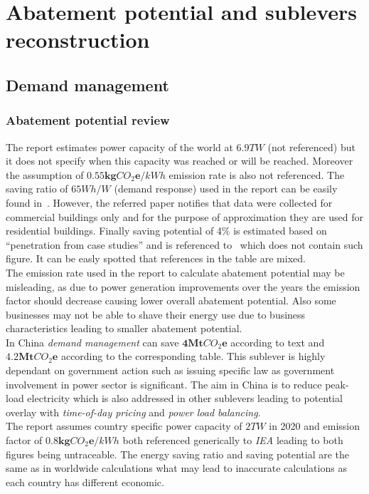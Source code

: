 \documentclass[11pt, twocolumn]{article}
\begin{document}
\section{Abatement potential and sublevers reconstruction}

\subsection{Demand management}
\subsubsection{Abatement potential review}
The report estimates power capacity of the world at $6.9 TW$ (not referenced) but it does not specify when this capacity was reached or will be reached. Moreover the assumption of $\mathbf{0.55} \mathbf{kg}CO_2\mathbf{e} / kWh$ emission rate is also not referenced. The saving ratio of $65 Wh/W$ (demand response) used in the report can be easily found in~\citep{grid2008green}. However, the referred paper notifies that data were collected for commercial buildings only and for the purpose of approximation they are used for residential buildings. Finally saving potential of 4\% is estimated based on ``penetration from case studies'' and is referenced to~\citep{grid2008green} which does not contain such figure. It can be easly spotted that references in the table are mixed.\\
The emission rate used in the report to calculate abatement potential may be misleading, as due to power generation improvements over the years the emission factor should decrease causing lower overall abatement potential. Also some businesses may not be able to shave their energy use due to business characteristics leading to smaller abatement potential.\\

In China \emph{demand management} can save $\mathbf{4} \mathbf{Mt}CO_2\mathbf{e}$ according to text and $\mathbf{4.2} \mathbf{Mt}CO_2\mathbf{e}$ according to the corresponding table. This sublever is highly dependant on government action such as issuing specific law as government involvement in power sector is significant. The aim in China is to reduce peak-load electricity which is also addressed in other sublevers leading to potential overlay with \emph{time-of-day pricing} and \emph{power load balancing}.\\
The report assumes country specific power capacity of $2 TW$ in 2020 and emission factor of $\mathbf{0.8} \mathbf{kg}CO_2\mathbf{e} / kWh$ both referenced generically to \emph{IEA} leading to both figures being untraceable. The energy saving ratio and saving potential are the same as in worldwide calculations what may lead to inaccurate calculations as each country has different economic.\\
\end{document}
